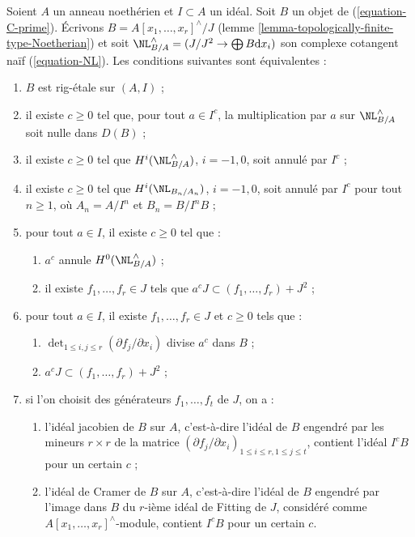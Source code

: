 \begin{lemma}
\label{lemma-equivalent-with-artin}
Soient $A$ un anneau noethérien et $I \subset A$ un idéal. Soit $B$ un objet
de (\ref{equation-C-prime}). Écrivons
$B = A[x_1, \ldots, x_r]^\wedge/J$
(lemme \ref{lemma-topologically-finite-type-Noetherian}) et soit
$\NL_{B/A}^\wedge = (J/J^2 \to \bigoplus B\text{d}x_i)$ son complexe
cotangent naïf (\ref{equation-NL}). Les conditions suivantes sont équivalentes :
\begin{enumerate}
\item $B$ est rig-étale sur $(A, I)$ ;
\item
\label{item-zero-on-NL}
il existe $c \geq 0$ tel que, pour tout $a \in I^c$, la multiplication par
$a$ sur $\NL_{B/A}^\wedge$ soit nulle dans $D(B)$ ;
\item
\label{item-zero-on-cohomology-NL}
il existe $c \geq 0$ tel que $H^i(\NL_{B/A}^\wedge)$, $i = -1, 0$, soit
annulé par $I^c$ ;
\item
\label{item-zero-on-cohomology-NL-truncations}
il existe $c \geq 0$ tel que $H^i(\NL_{B_n/A_n})$, $i = -1, 0$, soit annulé
par $I^c$ pour tout $n \geq 1$, où $A_n = A/I^n$ et $B_n = B/I^nB$ ;
\item
\label{item-condition-artin-pre-pre}
pour tout $a \in I$, il existe $c \geq 0$ tel que :
\begin{enumerate}
\item $a^c$ annule $H^0(\NL_{B/A}^\wedge)$ ;
\item il existe $f_1, \ldots, f_r \in J$ tels que
$a^c J \subset (f_1, \ldots, f_r) + J^2$ ;
\end{enumerate}
\item
\label{item-condition-artin-pre}
pour tout $a \in I$, il existe $f_1, \ldots, f_r \in J$ et $c \geq 0$ tels
que :
\begin{enumerate}
\item $\det_{1 \leq i, j \leq r}(\partial f_j/\partial x_i)$ divise $a^c$
dans $B$ ;
\item $a^c J \subset (f_1, \ldots, f_r) + J^2$ ;
\end{enumerate}
\item
\label{item-condition-artin}
si l'on choisit des générateurs $f_1, \ldots, f_t$ de $J$, on a :
\begin{enumerate}
\item l'idéal jacobien de $B$ sur $A$, c'est-à-dire l'idéal de $B$ engendré
par les mineurs $r \times r$ de la matrice
$(\partial f_j/\partial x_i)_{1 \leq i \leq r, 1 \leq j \leq t}$,
contient l'idéal $I^cB$ pour un certain $c$ ;
\item l'idéal de Cramer de $B$ sur $A$, c'est-à-dire l'idéal de $B$ engendré
par l'image dans $B$ du $r$-ième idéal de Fitting de $J$, considéré comme
$A[x_1, \ldots, x_r]^\wedge$-module, contient $I^cB$ pour un certain $c$.
\end{enumerate}
\end{enumerate}
\end{lemma}

